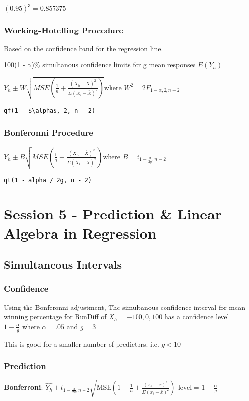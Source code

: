 \documentclass[11pt]{article}
\begin{document}
\((0.95)^3 = 0.857375\)

\subsubsection{Working-Hotelling Procedure}
\label{sec:org1e454a2}
Based on the confidence band for the regression line.

100(1 - \(\alpha\))\% simultanous confidence limits for g mean responses \(E(Y_h)\)

\(Y_h \pm W \sqrt{MSE(\frac{1}{n} +\frac{(X_h - \bar{X})^2}{\Sigma(X_i - \bar{X})^2})} \text{where } W^2 = 2 F_{1- \alpha, 2, n - 2}\)

\begin{verbatim}
qf(1 - $\alpha$, 2, n - 2)
\end{verbatim}

\subsubsection{Bonferonni Procedure}
\label{sec:orgb9183dc}

\(Y_h \pm B \sqrt{MSE(\frac{1}{n} + \frac{(X_h - \bar{X})^2}{\Sigma(X_i - \bar{X})^2}
)} \text{where } B = t_{1 -\frac{\alpha}{2g}, n - 2}\)

\begin{verbatim}
qt(1 - alpha / 2g, n - 2)
\end{verbatim}
\section{Session 5 - Prediction \& Linear Algebra in Regression}
\label{sec:orga593efa}
\subsection{Simultaneous Intervals}
\label{sec:org1bde28a}
\subsubsection{Confidence}
\label{sec:orgfa09822}
Using the Bonferonni adjustment, The simultanous confidence interval for mean winning percentage for RunDiff of
\(X_h = -100,0,100\) has a confidence level = \(1 - \frac{\alpha}{g}\) where \(\alpha
= .05\) and \(g = 3\)

This is good for a smaller number of predictors. i.e. \(g < 10\)
\subsubsection{Prediction}
\label{sec:orgb81b507}
\textbf{Bonferroni}: \(\hat{Y_h} \pm t_{1 -\frac{\alpha}{2g}, n-2}
\sqrt{\text{MSE}(1 + \frac{1}{n} +\frac{(x_h - \bar{x})^2}{\Sigma(x_i - \bar{x})^2})}\)
level = \(1 - \frac{\alpha}{g}\)
\end{document}
